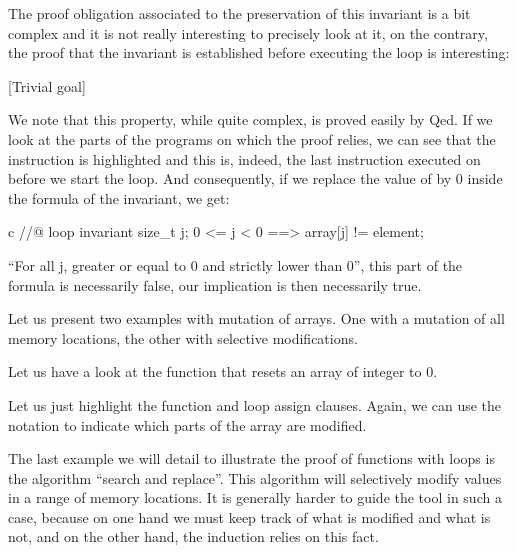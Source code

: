 The proof obligation associated to the preservation of this invariant is
a bit complex and it is not really interesting to precisely look at it,
on the contrary, the proof that the invariant is established before
executing the loop is interesting:



[Trivial goal]


We note that this property, while quite complex, is proved easily
by Qed. If we look at the parts of the programs on which the proof
relies, we can see that the instruction  is highlighted
and this is, indeed, the last instruction executed on  before
we start the loop. And consequently, if we replace the value of
 by 0 inside the formula of the invariant, we get:



\begin{CodeBlock}{c}
//@ loop invariant \forall size_t j; 0 <= j < 0 ==> array[j] != element;
\end{CodeBlock}



``For all j, greater or equal to 0 and strictly lower than 0'', this
part of the formula is necessarily false, our implication is then
necessarily true.





Let us present two examples with mutation of arrays. One with a mutation
of all memory locations, the other with selective modifications.





Let us have a look at the function that resets an array of integer to 0.






Let us just highlight the function and loop assign clauses. Again, we
can use the notation  to indicate which parts of the
array are modified.





The last example we will detail to illustrate the proof of functions
with loops is the algorithm ``search and replace''. This algorithm will
selectively modify values in a range of memory locations. It is
generally harder to guide the tool in such a case, because on one hand
we must keep track of what is modified and what is not, and on the other
hand, the induction relies on this fact.

